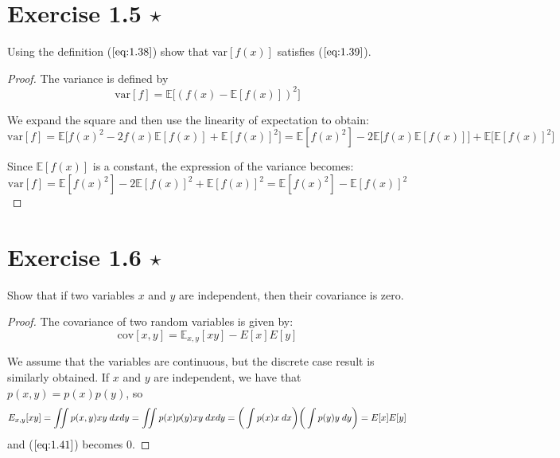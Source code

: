 \section*{Exercise 1.5 $\star$}
Using the definition ($\ref{eq:1.38}$) show that var$[f(x)]$ satisfies ($\ref{eq:1.39}$).

\vspace{1em}

\begin{proof}
    The variance is defined by 
    \begin{equation}\label{eq:1.38}\tag{1.38}
        \text{var}[f] = \mathbb{E}\big[(f(x) - \mathbb{E}[f(x)])^2\big]
    \end{equation}

    We expand the square and then use the linearity of expectation to obtain:
    \[
        \text{var}[f] 
        = \mathbb{E}\big[f(x)^2 - 2f(x)\mathbb{E}[f(x)] + \mathbb{E}[f(x)]^2\big]
        = \mathbb{E}[f(x)^2] - 2\mathbb{E}\big[f(x)\mathbb{E}[f(x)]\big] + \mathbb{E}\big[\mathbb{E}[f(x)]^2\big]
    \] 

    Since $\mathbb{E}[f(x)]$ is a constant, the expression of the variance becomes:
    \begin{equation}\label{eq:1.39}\tag{1.39}
        \text{var}[f] 
        = \mathbb{E}[f(x)^2] - 2\mathbb{E}[f(x)]^2 + \mathbb{E}[f(x)]^2
        = \mathbb{E}[f(x)^2] - \mathbb{E}[f(x)]^2
    \end{equation}
\end{proof}

\section*{Exercise 1.6 $\star$}
Show that if two variables $x$ and $y$ are independent, then their covariance is zero.

\vspace{1em}

\begin{proof}
    The covariance of two random variables is given by:
    \begin{equation}\label{eq:1.41}\tag{1.41}
        \text{cov}[x, y] = \mathbb{E}_{x, y} [xy] - E[x]E[y]
    \end{equation}

    We assume that the variables are continuous, but the discrete case result is similarly obtained.
    If $x$ and $y$ are independent, we have that $p(x, y) = p(x)p(y)$, so
     \[
         E_{x, y}[xy] = \iint p(x, y) xy \hspace{0.25em} dxdy 
         = \iint p(x) p(y) xy \hspace{0.25em} dxdy
         = \bigg(\int p(x) x \hspace{0.25em} dx\bigg) \bigg(\int p(y) y \hspace{0.25em} dy\bigg)
         = E[x]E[y]
    \] 
    and ($\ref{eq:1.41}$) becomes 0.
\end{proof}


